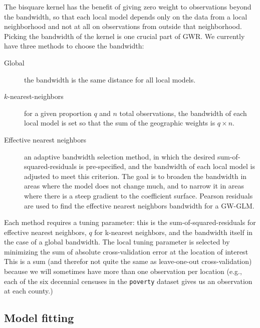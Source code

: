 \documentclass[10pt]{amsart}
\begin{document}
		The bisquare kernel has the benefit of giving zero weight to observations beyond the bandwidth, so that each local model depends only on the data from a local neighborhood and not at all on observations from outside that neighborhood.\\
		
		Picking the bandwidth of the kernel is one crucial part of GWR. We currently have three methods to choose the bandwidth:
		\begin{description}
			\item[Global] the bandwidth is the same distance for all local models.
			\item[$k$-nearest-neighbors] for a given proportion $q$ and $n$ total observations, the bandwidth of each local model is set so that the sum of the geographic weights is $q \times n$.
			\item[Effective nearest neighbors] an adaptive bandwidth selection method, in which the desired sum-of-squared-residuals is pre-specified, and the bandwidth of each local model is adjusted to meet this criterion. The goal is to broaden the bandwidth in areas where the model does not change much, and to narrow it in areas where there is a steep gradient to the coefficient surface. Pearson residuals are used to find the effective nearest neighbors bandwidth for a GW-GLM.
		\end{description}
		
		Each method requires a tuning parameter: this is the sum-of-squared-residuals for effective nearest neighbors, $q$ for k-nearest neighbors, and the bandwidth itself in the case of a global bandwidth. The local tuning parameter is selected by minimizing the sum of absolute cross-validation error at the location of interest This is a sum (and therefor not quite the same as leave-one-out cross-validation) because we will sometimes have more than one observation per location (e.g., each of the six decennial censuses in the \verb~poverty~ dataset gives us an observation at each county.)
		
		
	\subsection{Model fitting}
\end{document}
